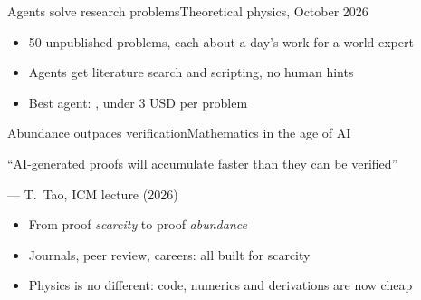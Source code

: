 \maketitle

\begin{frame}{Agents solve research problems}{Theoretical physics, October 2026}
  \begin{itemize}
    \item 50 unpublished problems, each about a day's work for a world expert
    \item Agents get literature search and scripting, no human hints
    \item<2-> Best agent: , under 3 USD per problem
  \end{itemize}

  \vspace{2ex}

  \slidecite{\citeTheoPhysEval}
\end{frame}

\begin{frame}{Abundance outpaces verification}{Mathematics in the age of AI}
  \vspace{2ex}
  \begin{center}
    \begin{minipage}{0.78\linewidth}
      \large\rmfamily ``AI-generated proofs will accumulate faster than they can be
      verified''
      \par\vspace{0.8ex}\hfill\normalsize --- T.~Tao, ICM lecture (2026)
    \end{minipage}
  \end{center}
  \vspace{2ex}

  \begin{itemize}
    \item From proof \emph{scarcity} to proof \emph{abundance}
    \item Journals, peer review, careers: all built for scarcity
    \item<2-> Physics is no different: code, numerics and derivations are now cheap
  \end{itemize}

  \slidecite{\citeTao}
\end{frame}

